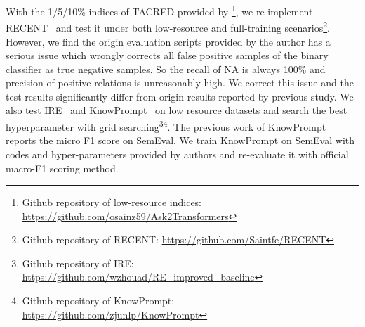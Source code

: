 With the 1/5/10\% indices of TACRED provided by \cite{sainz-etal-2021-label}\footnote{Github repository of low-resource indices: \url{https://github.com/osainz59/Ask2Transformers}}, we re-implement RECENT~\cite{lyu-chen-2021-relation} and test it under both low-resource and full-training scenarios\footnote{Github repository of RECENT: \url{https://github.com/Saintfe/RECENT}}. However, we find the origin evaluation scripts provided by the author has a serious issue which wrongly corrects all false positive samples of the binary classifier as true negative samples. So the recall of NA is always 100\% and precision of positive relations is unreasonably high. We correct this issue and the test results significantly differ from origin results reported by previous study. We also test IRE~\cite{zhou2021improved} and KnowPrompt~\cite{chen2021knowprompt} on low resource datasets and search the best hyperparameter with grid searching\footnote{Github repository of IRE: \url{https://github.com/wzhouad/RE\_improved\_baseline}}\footnote{Github repository of KnowPrompt: \url{https://github.com/zjunlp/KnowPrompt}}. The previous work of KnowPrompt reports the micro F1 score on SemEval. We train KnowPrompt on SemEval with codes and hyper-parameters provided by authors and re-evaluate it with official macro-F1 scoring method.





